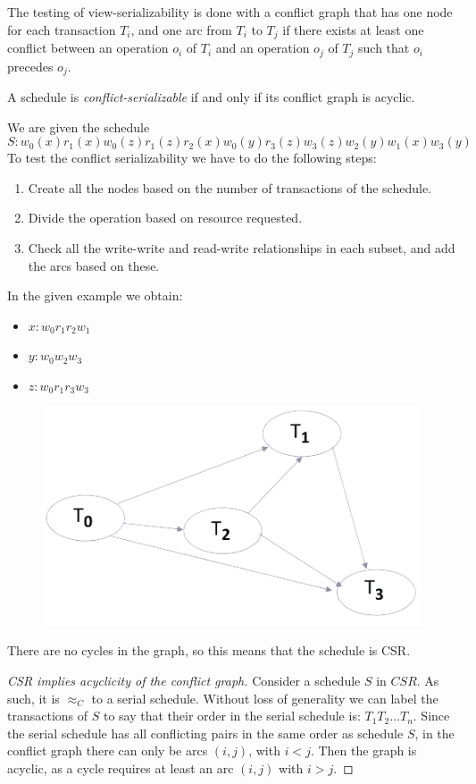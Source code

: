 \documentclass[12pt, a4paper]{report}
\newtheorem[style=M,bodystyle=\normalfont]{theorem}{Theorem}
\newtheorem[style=M,bodystyle=\normalfont]{corollary}{Corollary}
\newtheorem[style=M,bodystyle=\normalfont]{lemma}{Lemma}
\newtheorem[style=M,bodystyle=\normalfont]{definition}{Definition}
\begin{document}
    The testing of view-serializability is done with a conflict graph that has one node for each transaction $T_i$, and one arc from $T_i$ to $T_j$ if there exists at least one conflict between an operation $o_i$ of $T_i$ and an operation $o_j$ of $T_j$ such that $o_i$ precedes $o_j$.
    \begin{theorem}
        A schedule is \emph{conflict-serializable} if and only if its conflict graph is acyclic.
    \end{theorem}
    \begin{example}
        We are given the schedule \[S: w_0(x) r_1(x) w_0(z) r_1(z) r_2(x) w_0(y) r_3(z) w_3(z) w_2(y) w_1(x) w_3(y)\]
        To test the conflict serializability we have to do the following steps: 
        \begin{enumerate}
            \item Create all the nodes based on the number of transactions of the schedule. 
            \item Divide the operation based on resource requested.
            \item Check all the write-write and read-write relationships in each subset, and add the arcs based on these. 
        \end{enumerate}
        In the given example we obtain: 
        \begin{itemize}
            \item $x: w_0 r_1 r_2 w_1$
            \item $y: w_0 w_2 w_3$
            \item $z: w_0 r_1 r_3 w_3$
        \end{itemize}
        \begin{figure}[H]
            \centering
            \includegraphics[width=0.5\linewidth]{images/conflict.png}
        \end{figure}
        There are no cycles in the graph, so this means that the schedule is CSR. 
    \end{example}
    \begin{proof}[CSR implies acyclicity of the conflict graph]
        Consider a schedule $S$ in $CSR$. As such, it is $\approx_C$ to a serial schedule. 
        Without loss of generality we can label the transactions of $S$ to say that their order in the serial schedule is: $T_1 T_2 \dots T_n$.
        Since the serial schedule has all conflicting pairs in the same order as schedule $S$, in the conflict graph there can only be arcs $(i,j)$, with $i<j$. 
        Then the graph is acyclic, as a cycle requires at least an arc $(i,j)$ with $i>j$.
    \end{proof}
\end{document}

